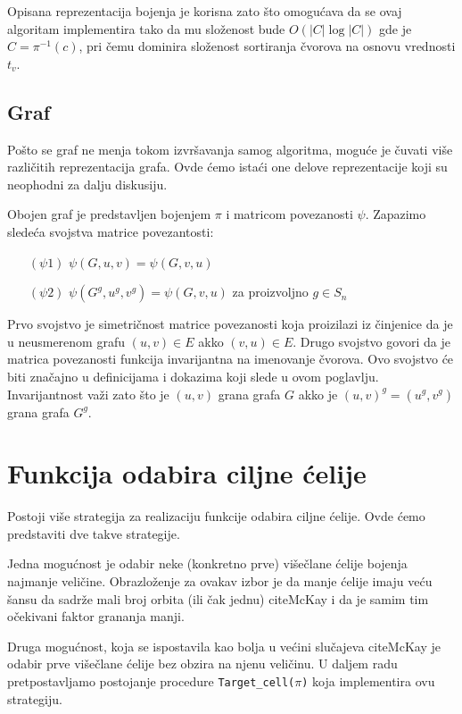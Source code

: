 \documentclass[12pt,oneside]{memoir}
\theoremstyle{definition}
\begin{document}
  Opisana reprezentacija bojenja je korisna zato što omogućava da se ovaj
  algoritam implementira tako da mu složenost bude $O(|C| \log |C|)$ gde je $C
  = \pi^{-1}(c)$, pri čemu dominira složenost sortiranja čvorova na osnovu
  vrednosti $t_v$.

  \subsection{Graf}

   Pošto se graf ne menja tokom izvršavanja samog algoritma, moguće je čuvati
   više različitih reprezentacija grafa. Ovde ćemo istaći one delove
   reprezentacije koji su neophodni za dalju diskusiju.

   Obojen graf je predstavljen bojenjem $\pi$ i matricom povezanosti $\psi$.
   Zapazimo sledeća svojstva matrice povezantosti:
   \begin{itemize}
	   \item[$(\psi1)$] $\psi(G, u, v) = \psi(G, v, u)$
	   \item[$(\psi2)$] $\psi(G^g, u^g, v^g) = \psi(G, v, u)$ za proizvoljno $g \in S_n$
   \end{itemize}
   Prvo svojstvo je simetričnost matrice povezanosti koja proizilazi iz
   činjenice da je u neusmerenom grafu $(u, v) \in E$ akko $(v, u) \in E$.
   Drugo svojstvo govori da je matrica povezanosti funkcija invarijantna na
   imenovanje čvorova. Ovo svojstvo će biti značajno u definicijama i dokazima
   koji slede u ovom poglavlju. Invarijantnost važi zato što je $(u, v)$ grana
   grafa $G$ akko je $(u, v)^g = (u^g, v^g)$ grana grafa $G^g$.

 \section{Funkcija odabira ciljne ćelije}

 Postoji više strategija za realizaciju funkcije odabira ciljne ćelije. Ovde
 ćemo predstaviti dve takve strategije.

 Jedna mogućnost je odabir neke (konkretno prve) višečlane ćelije bojenja
 najmanje veličine. Obrazloženje za ovakav izbor je da manje ćelije imaju veću
 šansu da sadrže mali broj orbita (ili čak jednu) cite{McKay} i da je samim
 tim očekivani faktor grananja manji.

 Druga mogućnost, koja se ispostavila kao bolja u većini slučajeva cite{McKay}
 je odabir prve višečlane ćelije bez obzira na njenu veličinu. U daljem radu
 pretpostavljamo postojanje procedure \texttt{Target\_cell($\pi$)} koja
 implementira ovu strategiju.
\end{document}
